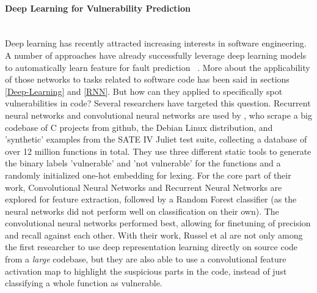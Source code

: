 \documentclass[
	a4paper,
	pagesize,
	pdftex,
	12pt,
	twoside, %
	BCOR=5mm, %
	ngerman,
	fleqn,
	final,
	]{scrartcl}
\begin{document}
\paragraph{Deep Learning for Vulnerability Prediction}\mbox{}\\
Deep learning has recently attracted increasing interests in software engineering. A number of approaches have already successfully leverage deep learning models to automatically learn feature for fault prediction ~\cite{IEEE.2015b,IEEE.2016,Wang.2016}. More about the applicability of those networks to tasks related to software code has been said in sections \ref{Deep-Learning} and \ref{RNN}. But how can they applied to specifically spot vulnerabilities in code? Several researchers have targeted this question.
Recurrent neural networks and convolutional neural networks are used by \cite{Russell.2018}, who scrape a big codebase of C projects from github, the Debian Linux distribution, and 'synthetic' examples from the SATE IV Juliet test suite, collecting a database of over 12 million functions in total. They use three different static tools to generate the binary labels 'vulnerable' and 'not vulnerable' for the functions and a randomly initialized one-hot embedding for lexing. For the core part of their work, Convolutional Neural Networks and Recurrent Neural Networks are explored for feature extraction, followed by a Random Forest classifier (as the neural networks did not perform well on classification on their own). The convolutional neural networks performed best, allowing for finetuning of precision and recall against each other. With their work, Russel et al are not only among the first researcher to use deep representation learning directly on source code from a \textit{large} codebase, but they are also able to use a convolutional feature activation map to highlight the suspicious parts in the code, instead of just classifying a whole function as vulnerable.\\
\end{document}
